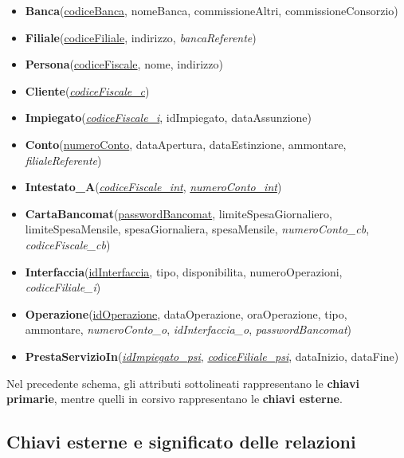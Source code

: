 \begin{itemize}
  \item \textbf{Banca}(\underline{codiceBanca}, nomeBanca, commissioneAltri, commissioneConsorzio)

  \item \textbf{Filiale}(\underline{codiceFiliale}, indirizzo, \textit{bancaReferente})

  \item \textbf{Persona}(\underline{codiceFiscale}, nome, indirizzo)

  \item \textbf{Cliente}(\underline{\textit{codiceFiscale\_c}})

  \item \textbf{Impiegato}(\underline{\textit{codiceFiscale\_i}}, idImpiegato, dataAssunzione)

  \item \textbf{Conto}(\underline{numeroConto}, dataApertura, dataEstinzione, ammontare, \textit{filialeReferente})

  \item \textbf{Intestato\_A}(\underline{\textit{codiceFiscale\_int}}, \underline{\textit{numeroConto\_int}})

  \item \textbf{CartaBancomat}(\underline{passwordBancomat}, limiteSpesaGiornaliero, limiteSpesaMensile, spesaGiornaliera, spesaMensile, \textit{numeroConto\_cb}, \textit{codiceFiscale\_cb})

  \item \textbf{Interfaccia}(\underline{idInterfaccia}, tipo, disponibilita, numeroOperazioni, \textit{codiceFiliale\_i})

  \item \textbf{Operazione}(\underline{idOperazione}, dataOperazione, oraOperazione, tipo, ammontare, \textit{numeroConto\_o}, \textit{idInterfaccia\_o}, \textit{passwordBancomat})

  \item \textbf{PrestaServizioIn}(\underline{\textit{idImpiegato\_psi}}, \underline{\textit{codiceFiliale\_psi}}, dataInizio, dataFine)
\end{itemize}

Nel precedente schema, gli attributi sottolineati rappresentano le \textbf{chiavi primarie}, mentre quelli in corsivo rappresentano le \textbf{chiavi esterne}.

\subsection{Chiavi esterne e significato delle relazioni}

